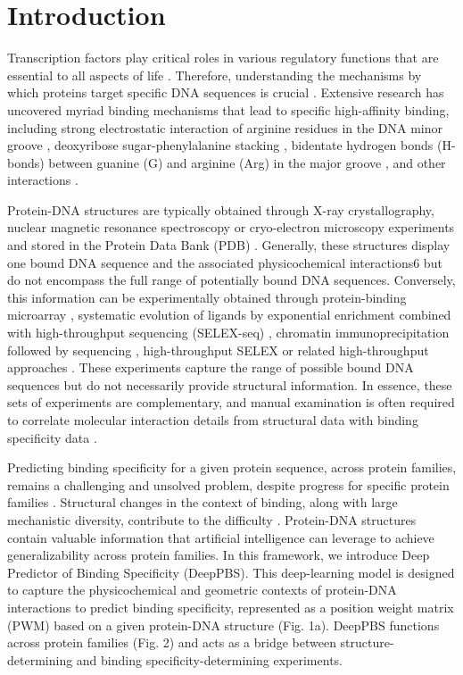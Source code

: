 \section{Introduction} 

Transcription factors play critical roles in various regulatory functions that are essential to all aspects of life \citep{Spitz2012}. Therefore, understanding the mechanisms by which proteins target specific DNA sequences is crucial \citep{Zhao2009}. Extensive research has uncovered myriad binding mechanisms that lead to specific high-affinity binding, including strong electrostatic interaction of arginine residues in the DNA minor groove \citep{rohs2009role}, deoxyribose sugar-phenylalanine stacking \citep{stirnimann2010structural}, bidentate hydrogen bonds (H-bonds) between guanine (G) and arginine (Arg) in the major groove \citep{Helene1977}, and other interactions \citep{Rohs2010,Schildbach1999,Seeman1976}.
\par
Protein-DNA structures are typically \citep{Garvie2001} obtained through X-ray crystallography, nuclear magnetic resonance spectroscopy or cryo-electron microscopy experiments and stored in the Protein Data Bank (PDB) \citep{berman2000protein}. Generally, these structures display one bound DNA sequence and the associated physicochemical interactions6 but do not encompass the full range of potentially bound DNA sequences. Conversely, this information can be experimentally obtained through protein-binding microarray \citep{Berger2009}, systematic evolution of ligands by exponential enrichment combined with high-throughput sequencing (SELEX-seq) \citep{Slattery2011}, chromatin immunoprecipitation followed by sequencing \citep{Park2009}, high-throughput SELEX \citep{Jolma2013} or related high-throughput approaches \citep{Slattery2014}. These experiments capture the range of possible bound DNA sequences but do not necessarily provide structural information. In essence, these sets of experiments are complementary, and manual examination is often required to correlate molecular interaction details from structural data with binding specificity data \citep{rohs2009role}.
\par
Predicting binding specificity for a given protein sequence, across protein families, remains a challenging and unsolved problem, despite progress for specific protein families \citep{persikov2014novo, Wetzel2022, persikov2009predicting, Sofia2022, Meseguer2020, molparia2010zif, christensen2012recognition, Yanover2011}. Structural changes in the context of binding, along with large mechanistic diversity, contribute to the difficulty \citep{Slattery2014, Chiu2023}. Protein-DNA structures contain valuable information that artificial intelligence can leverage to achieve generalizability across protein families. In this framework, we introduce Deep Predictor of Binding Specificity (DeepPBS). This deep-learning model is designed to capture the physicochemical and geometric contexts of protein-DNA interactions to predict binding specificity, represented as a position weight matrix (PWM) \citep{Stormo2013} based on a given protein-DNA structure (Fig. 1a). DeepPBS functions across protein families (Fig. 2) and acts as a bridge between structure-determining and binding specificity-determining experiments.
